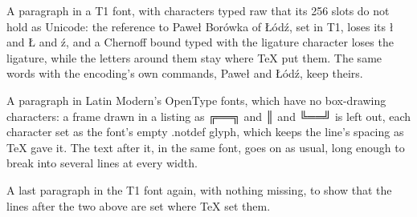 \documentclass{article}
\begin{document}
A paragraph in a T1 font, with characters typed raw that its 256 slots do
not hold as Unicode: the reference to Paweł Borówka of Łódź, set in T1, loses
its ł and Ł and ź, and a Chernoﬀ bound typed with the ligature character loses
the ligature, while the letters around them stay where TeX put them. The same
words with the encoding's own commands, Pawe\l{} and \L\'od\'z, keep theirs.

{\selectfont
A paragraph in Latin Modern's OpenType fonts, which have no box-drawing
characters: a frame drawn in a listing as ╔══╗ and ║ and ╚══╝ is left out,
each character set as the font's empty .notdef glyph, which keeps the line's
spacing as TeX gave it. The text after it, in the same font, goes on as
usual, long enough to break into several lines at every width.\par}

A last paragraph in the T1 font again, with nothing missing, to show that
the lines after the two above are set where TeX set them.
\end{document}
